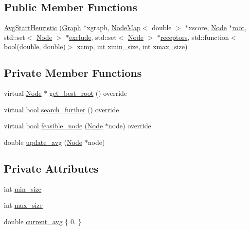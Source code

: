 \subsection*{Public Member Functions}
\begin{DoxyCompactItemize}
\item 
\hyperlink{classderegnet_1_1AvgStartHeuristic_afcbb54f71a6277598a40d6c06ebddbf0}{Avg\+Start\+Heuristic} (\hyperlink{namespacederegnet_a55b76c55bbabc682cbc61f8b9948799e}{Graph} $\ast$xgraph, \hyperlink{namespacederegnet_ae102b707ae1d6f83c639ece5e0dd5658}{Node\+Map}$<$ double $>$ $\ast$xscore, \hyperlink{namespacederegnet_a744bad34f2de9856d36715a445f027f3}{Node} $\ast$\hyperlink{classderegnet_1_1DeregnetStartHeuristic_a4605d41352e3adf1f9f9f32466a4e61e}{root}, std\+::set$<$ \hyperlink{namespacederegnet_a744bad34f2de9856d36715a445f027f3}{Node} $>$ $\ast$\hyperlink{classderegnet_1_1DeregnetStartHeuristic_aa22c6581cd404bf7ac325850b28dc951}{exclude}, std\+::set$<$ \hyperlink{namespacederegnet_a744bad34f2de9856d36715a445f027f3}{Node} $>$ $\ast$\hyperlink{classderegnet_1_1DeregnetStartHeuristic_ab80c046ff2b7c64086fceb84987b3e50}{receptors}, std\+::function$<$ bool(double, double)$>$ xcmp, int xmin\+\_\+size, int xmax\+\_\+size)
\end{DoxyCompactItemize}
\subsection*{Private Member Functions}
\begin{DoxyCompactItemize}
\item 
virtual \hyperlink{namespacederegnet_a744bad34f2de9856d36715a445f027f3}{Node} $\ast$ \hyperlink{classderegnet_1_1AvgStartHeuristic_ac13190b98b5611ad231fe3d9447431fb}{get\+\_\+best\+\_\+root} () override
\item 
virtual bool \hyperlink{classderegnet_1_1AvgStartHeuristic_a6fcfd578c66c01240d3484513a34bef6}{search\+\_\+further} () override
\item 
virtual bool \hyperlink{classderegnet_1_1AvgStartHeuristic_a3e18528bc735d47edcd719a72baf4e46}{feasible\+\_\+node} (\hyperlink{namespacederegnet_a744bad34f2de9856d36715a445f027f3}{Node} $\ast$node) override
\item 
double \hyperlink{classderegnet_1_1AvgStartHeuristic_ab3cbc873952af7525654194a7d5e59e0}{update\+\_\+avg} (\hyperlink{namespacederegnet_a744bad34f2de9856d36715a445f027f3}{Node} $\ast$node)
\end{DoxyCompactItemize}
\subsection*{Private Attributes}
\begin{DoxyCompactItemize}
\item 
int \hyperlink{classderegnet_1_1AvgStartHeuristic_a3abc4d801d4eb1fdb8ecfed7077045b3}{min\+\_\+size}
\item 
int \hyperlink{classderegnet_1_1AvgStartHeuristic_a4794e58ea33d94f9029defa3a31cc573}{max\+\_\+size}
\item 
double \hyperlink{classderegnet_1_1AvgStartHeuristic_a2c4b3fa6aa7946276404e650ea42fd14}{current\+\_\+avg} \{ 0. \}
\end{DoxyCompactItemize}
